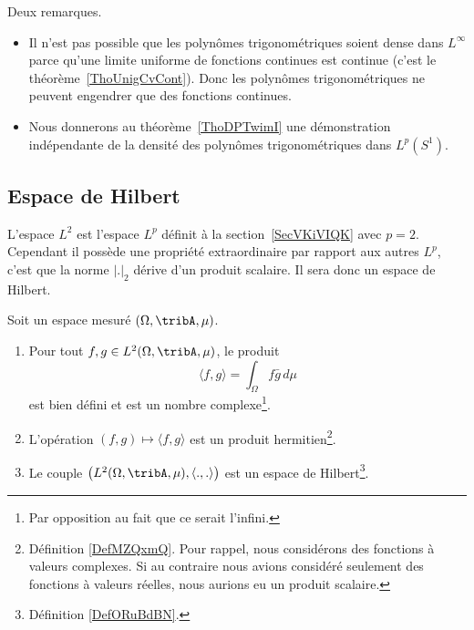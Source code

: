 \begin{remark}
    Deux remarques.
    \begin{itemize}
        \item
            Il n'est pas possible que les polynômes trigonométriques soient dense dans \( L^{\infty}\) parce qu'une limite uniforme de fonctions continues est continue (c'est le théorème~\ref{ThoUnigCvCont}). Donc les polynômes trigonométriques ne peuvent engendrer que des fonctions continues.
        \item
            Nous donnerons au théorème~\ref{ThoDPTwimI} une démonstration indépendante de la densité des polynômes trigonométriques dans \( L^p(S^1)\).
    \end{itemize}
\end{remark}

\subsection{Espace de Hilbert}

L'espace \( L^2\) est l'espace \( L^p\) définit à la section~\ref{SecVKiVIQK} avec \( p=2\). Cependant il possède une propriété extraordinaire par rapport aux autres \( L^p\), c'est que la norme \( | . |_2\) dérive d'un produit scalaire. Il sera donc un espace de Hilbert.

\begin{lemma}   \label{LemIVWooZyWodb}
    Soit un espace mesuré \( (\Omega,\tribA,\mu)\).
    \begin{enumerate}
        \item
            Pour tout \( f,g\in L^2(\Omega,\tribA,\mu)\), le produit 
            \begin{equation}
                \langle f, g\rangle =\int_{\Omega}f\bar g\,d\mu 
            \end{equation}
            est bien défini et est un nombre complexe\footnote{Par opposition au fait que ce serait l'infini.}.
        \item
            L'opération \( (f,g)\mapsto \langle f, g\rangle \) est un produit hermitien\footnote{Définition \ref{DefMZQxmQ}. Pour rappel, nous considérons des fonctions à valeurs complexes. Si au contraire nous avions considéré seulement des fonctions à valeurs réelles, nous aurions eu un produit scalaire.}.
        \item
            Le couple \( \big( L^2(\Omega,\tribA,\mu),\langle ., .\rangle  \big)\) est un espace de Hilbert\footnote{Définition \ref{DefORuBdBN}.}.
    \end{enumerate}
\end{lemma}

